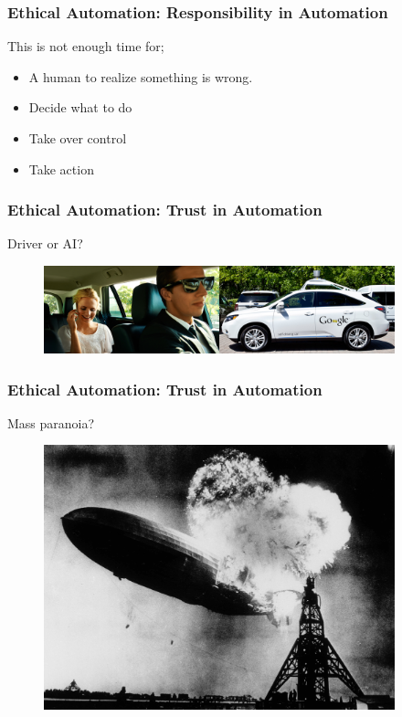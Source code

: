 \begin{frame}
  \frametitle{ Ethical Automation: Responsibility in Automation}
  {\Large This is not enough time for;}
  \begin{itemize}
    \item A human to realize something is wrong.
    \item Decide what to do
    \item Take over control
    \item Take action
  \end{itemize}
\end{frame}

\begin{frame}
  \frametitle{ Ethical Automation: Trust in Automation}
  {\Large Driver or AI?}
  \begin{figure}[bht]
    \centering
    \includegraphics[width=4.0in]{diagrams/car}
  \end{figure}
\end{frame}

\begin{frame}
  \frametitle{ Ethical Automation: Trust in Automation}
  {\Large Mass paranoia?}
  \begin{figure}[bht]
    \centering
    \includegraphics[width=4.0in]{diagrams/Hindenburg}
  \end{figure}
\end{frame}

